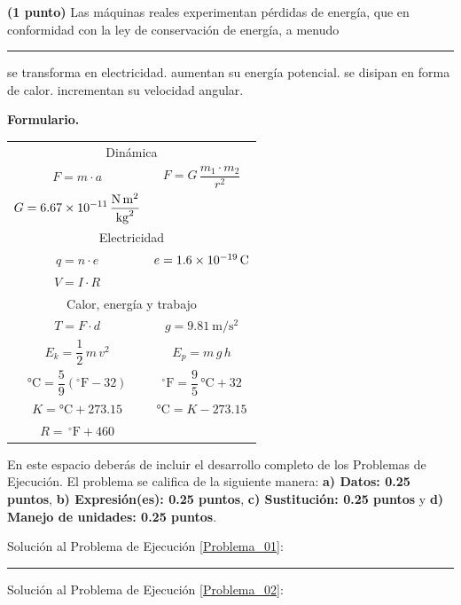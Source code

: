 \documentclass[12pt, letter]{exam}
\begin{document}
\begin{questions}
    \newpage

    \question \textbf{(1 punto)} Las máquinas reales experimentan pérdidas de energía, que en conformidad con la ley de conservación de energía, a menudo \rule{2cm}{0.1mm}
    \begin{multicols}{2}
    \begin{tasks}
        \task se transforma en electricidad.
        \task aumentan su energía potencial.
        \task se disipan en forma de calor.
        \task incrementan su velocidad angular.
    \end{tasks}
    \end{multicols}

\end{questions}

\textbf{\huge{Formulario.}}
\begin{table}[H]
\centering
\setlength{\tabcolsep}{40pt}
\renewcommand{\arraystretch}{1.5}
\begin{tabular}{c  c}
    \multicolumn{2}{c}{Dinámica} \\
    $F = m \cdot a$ & $F = G \, \dfrac{m_{1} \cdot m_{2}}{r^{2}}$ \\
    $G = \displaystyle \SI[per-mode=fraction]{6.67d-11}{\newton\square\meter\per\square\kilo\gram}$ &  \\ \hline
    \multicolumn{2}{c}{Electricidad} \\
    $q = n \cdot e$ & $e = \SI{1.6d-19}{\coulomb}$ \\
    $V = I \cdot R$ & \\
    \hline
    \multicolumn{2}{c}{Calor, energía y trabajo} \\
    $T = F \cdot d$ & $g = \displaystyle \SI{9.81}{\meter\per\square\second}$ \\
    $E_{k} = \dfrac{1}{2} \, m \, v^{2}$ & $E_{p} = m \, g \, h$ \\
    $\unit{\degreeCelsius} = \dfrac{5}{9} \left( ^{\circ}\text{F} - 32 \right)$ & $^{\circ}\text{F} = \dfrac{9}{5} \, \unit{\degreeCelsius} + 32$ \\
    $K = \unit{\degreeCelsius} + 273.15$ & $\unit{\degreeCelsius} = K - 273.15$ \\
    $R = \, ^{\circ}\text{F} + 460$ & \\
\end{tabular}
\end{table}

En este espacio deberás de incluir el desarrollo completo de los Problemas de Ejecución. El problema se califica de la siguiente manera: \textbf{a) Datos: 0.25 puntos}, \textbf{b) Expresión(es): 0.25 puntos}, \textbf{c) Sustitución: 0.25 puntos} y \textbf{d) Manejo de unidades: 0.25 puntos}.

\vspace*{0.5cm}
Solución al Problema de Ejecución \ref{Problema_01}:

\vspace*{3.5cm}
\rule{0.9\textwidth}{0.3mm}

Solución al Problema de Ejecución \ref{Problema_02}:
\end{document}

